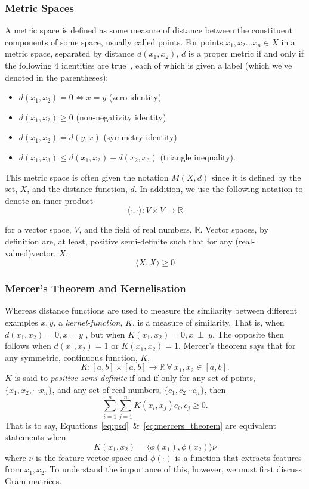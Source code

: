 \documentclass[conference]{IEEEtran}
\begin{document}
\subsubsection{Metric Spaces}

A metric space is defined as some measure of distance between the constituent components of some space, usually called points.  For points $x_1,x_2...x_n \in X$ in a metric space, separated by distance $d(x_1,x_2)$, $d$ is a proper metric if and only if the following 4 identities are true~\cite{metrics}, each of which is given a label (which we've denoted in the parentheses):

\label{metric_spaces}
\begin{itemize}
    \item $d(x_1,x_2) = 0 \iff x = y$ (zero identity)
    \item $d(x_1,x_2) \geq 0$ (non-negativity identity)
    \item $d(x_1,x_2) = d(y, x)$ (symmetry identity)
    \item $d(x_1, x_3) \leq d(x_1,x_2) + d(x_2,x_3)$ (triangle inequality).
\end{itemize}
This metric space is often given the notation $M(X,d)$ since it is defined by the set, $X$, and the distance function, $d$.
In addition, we use the following notation to denote an inner product
$$
\langle \cdot , \cdot \rangle : V \times V \rightarrow \mathbb{R}
$$

for a vector space, $V$, and the field of real numbers, $\mathbb{R}$. 
Vector spaces, by definition are, at least, positive semi-definite such that for any (real-valued)vector, $X$, 
\begin{equation}
\langle X, X \rangle \geq 0
\label{eq:psd}
\end{equation}

\subsubsection{Mercer's Theorem and Kernelisation}

Whereas distance functions are used to measure the similarity between different examples $x,y$, a \textit{kernel-function}, $K$, is a measure of similarity. That is, when $d(x_1,x_2) = 0, x = y$ , but when $K(x_1,x_2) = 0, x~\perp~y$. The opposite then follows when $d(x_1,x_2)=1$ or $K(x_1,x_2)=1$. Mercer's theorem says that for any symmetric, continuous function, $K$,
$$
K : [a, b] \times [a, b] \rightarrow \mathbb{R}~\forall~x_1,x_2 \in [a,b].
$$
$K$ is said to \textit{positive semi-definite} if and if only for any set of points, $\{x_1, x_2, \cdots x_n\}$, and any set of real numbers, $\{ c_1, c_2 \cdots c_n\}$, then
\begin{equation}
\sum_{i=1}^n \sum_{j=1}^n K(x_i, x_j) c_i, c_j \geq 0.
\label{eq:mercers_theorem}
\end{equation}
That is to say, Equations~\ref{eq:psd}~\&~\ref{eq:mercers_theorem} are equivalent statements when 
$$
K(x_1, x_2) = \langle \phi(x_1), \phi(x_2) \rangle \nu
$$
where $\nu$ is the feature vector space and $\phi(\cdot)$ is a function that extracts features from $x_1,x_2$.
To understand the importance of this, however, we must first discuss Gram matrices.
\end{document}
